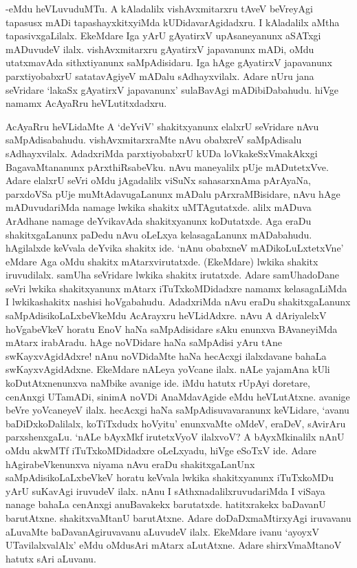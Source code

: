 -eMdu heVLuvuduMTu. A kAladalilx vishAvxmitarxru tAveV beVreyAgi tapasusx mADi tapashayxkitxyiMda kUDidavarAgidadxru. I kAladalilx aMtha tapasivxgaLilalx. EkeMdare Iga yArU gAyatirxV upAsaneyanunx aSATxgi mADuvudeV ilalx. vishAvxmitarxru gAyatirxV japavanunx mADi, oMdu utatxmavAda sithxtiyanunx saMpAdisidaru. Iga hAge gAyatirxV japavanunx parxtiyobabxrU satatavAgiyeV mADalu sAdhayxvilalx. Adare nUru jana seVridare `lakaSx gAyatirxV japavanunx' sulaBavAgi mADibiDabahudu. hiVge namamx AcAyaRru heVLutitxdadxru.

AcAyaRru heVLidaMte A `deYviV' shakitxyanunx elalxrU seVridare nAvu saMpAdisabahudu. vishAvxmitarxraMte nAvu obabxreV saMpAdisalu sAdhayxvilalx. AdadxriMda parxtiyobabxrU kUDa loVkakeSxVmakAkxgi BagavaMtananunx pArxthiRsabeVku. nAvu maneyalilx pUje mADutetxVve. Adare elalxrU seVri oMdu jAgadalilx viSuNx sahasarxnAma pArAyaNa, parxdoVSa pUje muMtAdavugaLanunx mADalu pArxraMBisidare, nAvu hAge mADuvudariMda namage lwkika shakitx uMTAgutatxde. alilx mADuva ArAdhane namage deYvikavAda shakitxyanunx koDutatxde. Aga eraDu shakitxgaLanunx paDedu nAvu oLeLxya kelasagaLanunx mADabahudu. hAgilalxde keVvala deYvika shakitx ide. `nAnu obabxneV mADikoLuLxtetxVne' eMdare Aga oMdu shakitx mAtarxvirutatxde. (EkeMdare) lwkika shakitx iruvudilalx. samUha seVridare lwkika shakitx irutatxde. Adare samUhadoDane seVri lwkika shakitxyanunx mAtarx iTuTxkoMDidadxre namamx kelasagaLiMda I lwkikashakitx nashisi hoVgabahudu. AdadxriMda nAvu eraDu shakitxgaLanunx saMpAdisikoLaLxbeVkeMdu AcArayxru heVLidAdxre. nAvu A dAriyalelxV hoVgabeVkeV horatu EnoV haNa saMpAdisidare sAku enunxva BAvaneyiMda mAtarx irabAradu. hAge noVDidare haNa saMpAdisi yAru tAne swKayxvAgidAdxre! nAnu noVDidaMte haNa hecAcxgi ilalxdavane bahaLa swKayxvAgidAdxne. EkeMdare nALeya yoVcane ilalx. nALe yajamAna kUli koDutAtxnenunxva naMbike avanige ide. iMdu hatutx rUpAyi doretare, cenAnxgi UTamADi, sinimA noVDi AnaMdavAgide eMdu heVLutAtxne. avanige beVre yoVcaneyeV ilalx. hecAcxgi haNa saMpAdisuvavaranunx keVLidare, `avanu baDiDxkoDalilalx, koTiTxdudx hoVyitu' enunxvaMte oMdeV, eraDeV, sAvirAru parxshenxgaLu. `nALe bAyxMkf irutetxVyoV ilalxvoV? A bAyxMkinalilx nAnU oMdu akwMTf iTuTxkoMDidadxre oLeLxyadu, hiVge eSoTxV ide. Adare hAgirabeVkenunxva niyama nAvu eraDu shakitxgaLanUnx saMpAdisikoLaLxbeVkeV horatu keVvala lwkika shakitxyanunx iTuTxkoMDu yArU suKavAgi iruvudeV ilalx. nAnu I sAthxnadalilxruvudariMda I viSaya nanage bahaLa cenAnxgi anuBavakekx barutatxde. hatitxrakekx baDavanU barutAtxne. shakitxvaMtanU barutAtxne. Adare doDaDxmaMtirxyAgi iruvavanu aLuvaMte baDavanAgiruvavanu aLuvudeV ilalx. EkeMdare ivanu `ayoyxV UTavilalxvalAlx' eMdu oMdusAri mAtarx aLutAtxne. Adare shirxVmaMtanoV hatutx sAri aLuvanu.


